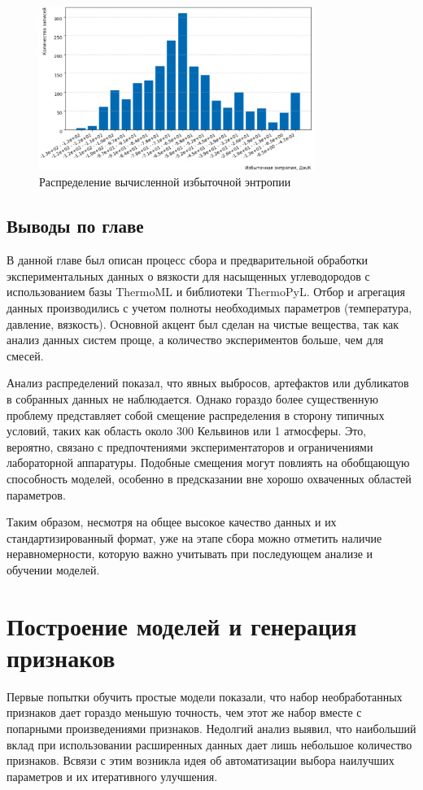 \documentclass[a4paper,12pt]{article}
\begin{document}
      \begin{figure}[ht!]
          \centering
          \includegraphics[width=0.8\textwidth]{data_distribution_excess_entropy.png}
          \caption{Распределение вычисленной избыточной энтропии}
          \label{fig:data_distribution_excess_entropy}
      \end{figure}
      
  \subsection{Выводы по главе}
    В данной главе был описан процесс сбора и предварительной обработки экспериментальных данных о вязкости для насыщенных углеводородов с использованием базы ThermoML и библиотеки ThermoPyL. Отбор и агрегация данных производились с учетом полноты необходимых параметров (температура, давление, вязкость). Основной акцент был сделан на чистые вещества, так как анализ данных систем проще, а количество экспериментов больше, чем для смесей.

    Анализ распределений показал, что явных выбросов, артефактов или дубликатов в собранных данных не наблюдается. Однако гораздо более существенную проблему представляет собой смещение распределения в сторону типичных условий, таких как область около 300 Кельвинов или 1 атмосферы. Это, вероятно, связано с предпочтениями экспериментаторов и ограничениями лабораторной аппаратуры. Подобные смещения могут повлиять на обобщающую способность моделей, особенно в предсказании вне хорошо охваченных областей параметров.

    Таким образом, несмотря на общее высокое качество данных и их стандартизированный формат, уже на этапе сбора можно отметить наличие неравномерности, которую важно учитывать при последующем анализе и обучении моделей.
\newpage

\section{Построение моделей и генерация признаков}
  Первые попытки обучить простые модели показали, что набор необработанных признаков дает гораздо меньшую точность, чем этот же набор вместе с попарными произведениями признаков. Недолгий анализ выявил, что наибольший вклад при использовании расширенных данных дает лишь небольшое количество признаков. Всвязи с этим возникла идея об автоматизации выбора наилучших параметров и их итеративного улучшения.
\end{document}
